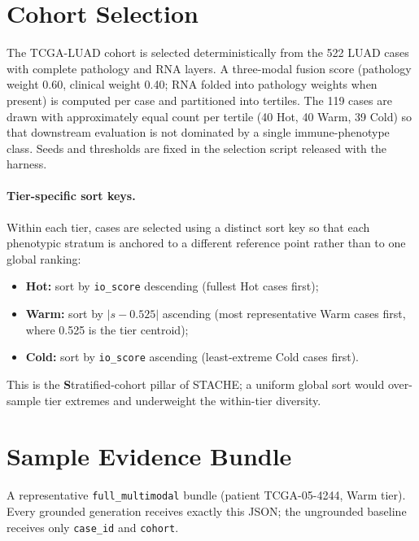 \documentclass[11pt]{article}
\begin{document}
\section{Cohort Selection}
\label{app:cohort}

The TCGA-LUAD cohort is selected deterministically from the 522 LUAD cases with complete pathology and RNA layers. A three-modal fusion score (pathology weight 0.60, clinical weight 0.40; RNA folded into pathology weights when present) is computed per case and partitioned into tertiles. The 119 cases are drawn with approximately equal count per tertile (40 Hot, 40 Warm, 39 Cold) so that downstream evaluation is not dominated by a single immune-phenotype class. Seeds and thresholds are fixed in the selection script released with the harness.

\paragraph{Tier-specific sort keys.} Within each tier, cases are selected using a distinct sort key so that each phenotypic stratum is anchored to a different reference point rather than to one global ranking:
\begin{itemize}
\item \textbf{Hot:} sort by \texttt{io\_score} descending (fullest Hot cases first);
\item \textbf{Warm:} sort by $|s - 0.525|$ ascending (most representative Warm cases first, where 0.525 is the tier centroid);
\item \textbf{Cold:} sort by \texttt{io\_score} ascending (least-extreme Cold cases first).
\end{itemize}
This is the \textbf{S}tratified-cohort pillar of STACHE; a uniform global sort would over-sample tier extremes and underweight the within-tier diversity.

\section{Sample Evidence Bundle}
\label{app:bundle}

A representative \texttt{full\_multimodal} bundle (patient TCGA-05-4244, Warm tier). Every grounded generation receives exactly this JSON; the ungrounded baseline receives only \texttt{case\_id} and \texttt{cohort}.
\end{document}
